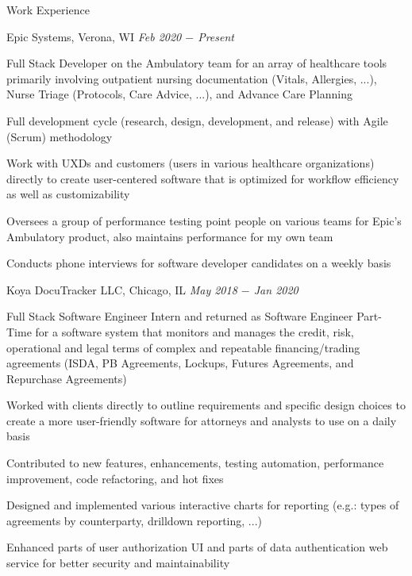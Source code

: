 \documentclass{resume}
\begin{document}
\begin{rSection}{Work Experience}

\begin{rSubsection}{Epic Systems, Verona, WI} {\textit{Feb 2020 $-$ Present}}
{}

    \item Full Stack Developer on the Ambulatory team for an array of healthcare tools primarily involving outpatient nursing documentation (Vitals, Allergies, ...), Nurse Triage (Protocols, Care Advice, ...), and Advance Care Planning
    \item Full development cycle (research, design, development, and release) with Agile (Scrum) methodology
    \item Work with UXDs and customers (users in various healthcare organizations) directly to create user-centered software that is optimized for workflow efficiency as well as customizability
    \item Oversees a group of performance testing point people on various teams for Epic's Ambulatory product, also maintains performance for my own team
    \item Conducts phone interviews for software developer candidates on a weekly basis

\end{rSubsection}

\begin{rSubsection}{Koya DocuTracker LLC, Chicago, IL} {\textit{May 2018 $-$ Jan 2020}}
{}

    \item Full Stack Software Engineer Intern and returned as Software Engineer Part-Time for a software system that monitors and manages the credit, risk, operational and legal terms of complex and repeatable financing/trading agreements (ISDA, PB Agreements, Lockups, Futures Agreements, and Repurchase Agreements)
    \item Worked with clients directly to outline requirements and specific design choices to create a more user-friendly software for attorneys and analysts to use on a daily basis
    \item Contributed to new features, enhancements, testing automation, performance improvement, code refactoring, and hot fixes
    \item Designed and implemented various interactive charts for reporting (e.g.: types of agreements by counterparty, drilldown reporting, ...)
    \item Enhanced parts of user authorization UI and parts of data authentication web service for better security and maintainability

\end{rSubsection}

\end{rSection}
\end{document}

